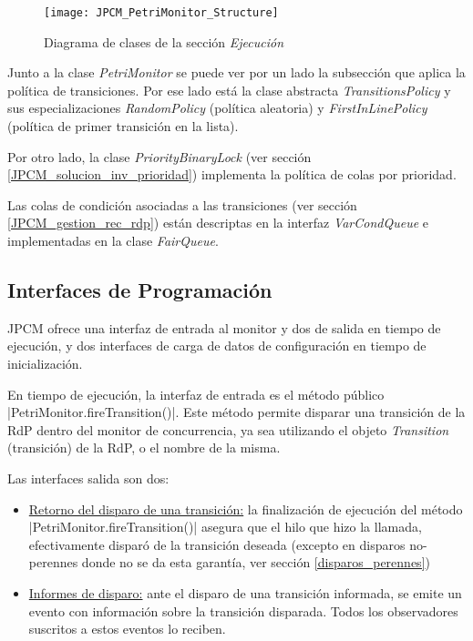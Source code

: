 \begin{figure}[H]
  \hspace*{-2.5cm}
  \texttt{[image: JPCM\_PetriMonitor\_Structure]}
  \caption{Diagrama de clases de la sección \textit{Ejecución}}
  \label{fig:JPCM_PetriMonitor_Structure}
\end{figure}

Junto a la clase \textit{PetriMonitor} se puede ver por un lado la subsección
que aplica la política de transiciones. Por ese lado está la clase abstracta
\textit{TransitionsPolicy} y sus especializaciones \textit{RandomPolicy}
(política aleatoria) y \textit{FirstInLinePolicy} (política de primer transición
en la lista).

Por otro lado, la clase \textit{PriorityBinaryLock} (ver sección
\ref{JPCM_solucion_inv_prioridad}) implementa la política de colas por
prioridad.

Las colas de condición asociadas a las transiciones (ver sección
\ref{JPCM_gestion_rec_rdp}) están descriptas en la interfaz
\textit{VarCondQueue} e implementadas en la clase \textit{FairQueue}.


\subsection{Interfaces de Programación}

JPCM ofrece una interfaz de entrada al monitor y dos de salida en tiempo de
ejecución, y dos interfaces de carga de datos de configuración en tiempo de
inicialización.

En tiempo de ejecución, la interfaz de entrada es el método público 
|PetriMonitor.fireTransition()|. Este método permite disparar una
transición de la RdP dentro del monitor de concurrencia, ya sea utilizando el
objeto \textit{Transition} (transición) de la RdP, o el nombre de la misma.

Las interfaces salida son dos:
\begin{itemize}
  \item \underline{Retorno del disparo de una transición:} la finalización de
  ejecución del método |PetriMonitor.fireTransition()| asegura que el
  hilo que hizo la llamada, efectivamente disparó de la transición deseada
  (excepto en disparos no-perennes donde no se da esta garantía, ver sección
  \ref{disparos_perennes})
  \item \underline{Informes de disparo:} ante el disparo de una
  transición informada, se emite un evento con información sobre la transición
  disparada. Todos los observadores suscritos a estos eventos lo reciben.
\end{itemize}

